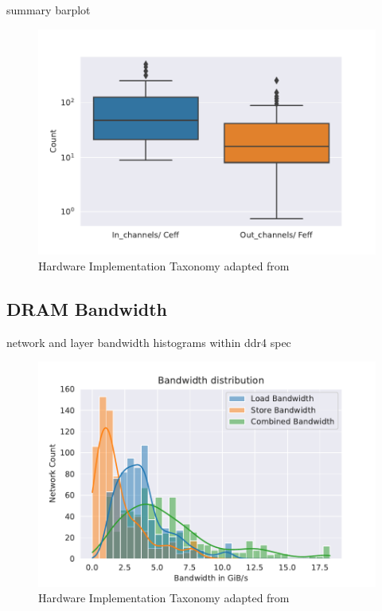 summary barplot

\begin{figure}[ht]
    \centering
    \includegraphics[scale=0.58]{Plots/utilization/summary.pdf}
    \caption{Hardware Implementation Taxonomy adapted from \cite{maestro}}
    \label{fig:hw_taxonomy}
\end{figure}


\subsection{DRAM Bandwidth}
\label{chap:hero:sim_platform:cigar_side}

network and layer bandwidth histograms
within ddr4 spec

\begin{figure}[ht]
    \centering
    \includegraphics[scale=0.58]{Plots/resources/net_bw.pdf}
    \caption{Hardware Implementation Taxonomy adapted from \cite{maestro}}
    \label{fig:hw_taxonomy}
\end{figure}


